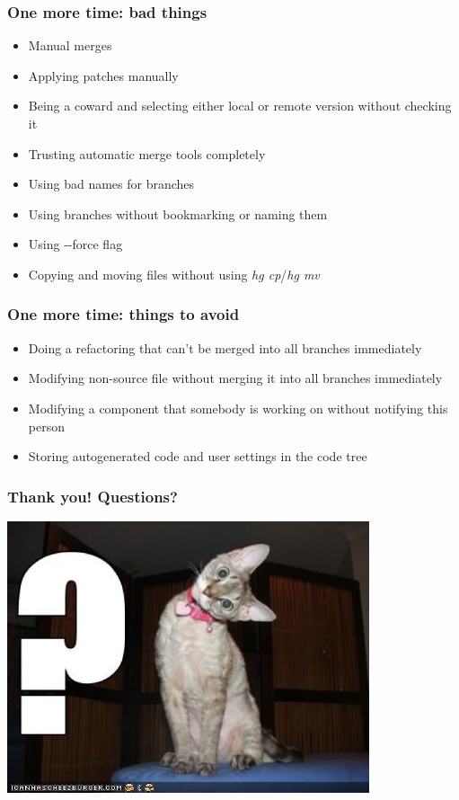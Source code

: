 \documentclass{beamer}
\begin{document}
\begin{frame}[fragile]
\frametitle{One more time: bad things}
\begin{itemize}
\item Manual merges
\item Applying patches manually
\item Being a coward and selecting either local or remote version without checking it
\item Trusting automatic merge tools completely
\item Using bad names for branches
\item Using branches without bookmarking or naming them
\item Using \textrm{-}\textrm{-force} flag
\item Copying and moving files without using \textit{hg cp}/\textit{hg mv} 
\end{itemize}
\end{frame}

\begin{frame}
\frametitle{One more time: things to avoid}
\begin{itemize}
\item Doing a refactoring that can't be merged into all branches immediately
\item Modifying non-source file without merging it into all branches immediately
\item Modifying a component that somebody is working on without notifying this person 
\item Storing autogenerated code and user settings in the code tree
\end{itemize}
\end{frame}


\begin{frame}
\frametitle{Thank you! Questions?}
\begin{center}
\includegraphics[width=0.8\textwidth]{img/cat}
\end{center}
\end{frame}
\end{document}

